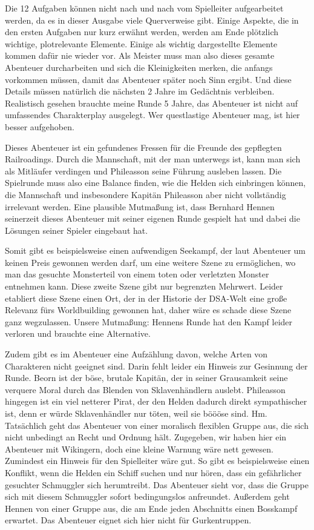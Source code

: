 \documentclass[final]{multiversum}
\begin{document}
Die 12 Aufgaben können nicht nach und nach vom Spielleiter aufgearbeitet werden, 
da es in dieser Ausgabe
viele Querverweise gibt. Einige Aspekte, die in den ersten Aufgaben nur kurz
erwähnt werden, werden am Ende plötzlich wichtige, plotrelevante Elemente. Einige
als wichtig dargestellte Elemente kommen dafür nie wieder vor. Als Meister muss
man also dieses gesamte Abenteuer durcharbeiten und sich die Kleinigkeiten
merken, die anfangs vorkommen müssen, damit das Abenteuer später noch Sinn
ergibt. Und diese Details müssen natürlich die nächsten 2 Jahre im Gedächtnis
verbleiben. Realistisch gesehen brauchte meine Runde 5 Jahre, das Abenteuer ist
nicht auf umfassendes Charakterplay ausgelegt. Wer questlastige Abenteuer mag,
ist hier besser aufgehoben.

Dieses Abenteuer ist ein gefundenes Fressen für die Freunde des gepflegten
Railroadings. Durch die Mannschaft, mit der man unterwegs ist, kann man sich als
Mitläufer verdingen und Phileasson seine Führung ausleben lassen. Die Spielrunde
muss also eine Balance finden, wie die Helden sich einbringen können, die
Mannschaft und insbesondere Kapitän Phileasson aber nicht vollständig irrelevant
werden. Eine plausible Mutmaßung ist, dass Bernhard Hennen seinerzeit dieses
Abenteuer mit seiner eigenen Runde gespielt hat und dabei die Lösungen seiner
Spieler eingebaut hat.

Somit gibt es beispielsweise einen aufwendigen Seekampf, der laut Abenteuer um
keinen Preis gewonnen werden darf, um eine weitere Szene zu ermöglichen, wo man
das gesuchte Monsterteil von einem toten oder verletzten Monster entnehmen kann.
Diese zweite Szene gibt nur begrenzten Mehrwert. Leider etabliert diese Szene
einen Ort, der in der Historie der DSA-Welt eine große Relevanz fürs
Worldbuilding gewonnen hat, daher wäre es schade diese Szene ganz wegzulassen. 
Unsere Mutmaßung: Hennens Runde hat den Kampf leider verloren und brauchte eine
Alternative.

Zudem gibt es im Abenteuer eine Aufzählung davon, welche Arten von Charakteren
nicht geeignet sind. Darin fehlt leider ein Hinweis zur Gesinnung der Runde.
Beorn ist der böse, brutale Kapitän, der in seiner Grausamkeit seine verquere
Moral durch das Blenden von Sklavenhändlern auslebt. Phileasson hingegen ist ein
viel netterer Pirat, der den Helden dadurch direkt sympathischer ist, denn er
würde Sklavenhändler nur töten, weil sie böööse sind. Hm.
Tatsächlich geht das Abenteuer von einer moralisch flexiblen Gruppe aus, die
sich nicht unbedingt an Recht und Ordnung hält. Zugegeben, wir haben hier ein
Abenteuer mit Wikingern, doch eine kleine Warnung wäre nett gewesen. Zumindest
ein Hinweis für den Spielleiter wäre gut. So gibt es beispielsweise einen
Konflikt, wenn die Helden ein Schiff suchen und nur hören, dass ein gefährlicher
gesuchter Schmuggler sich herumtreibt. Das Abenteuer sieht vor, dass die Gruppe
sich mit diesem Schmuggler sofort bedingungslos anfreundet. Außerdem geht Hennen
von einer Gruppe aus, die am Ende jeden Abschnitts einen Bosskampf erwartet. Das
Abenteuer eignet sich hier nicht für Gurkentruppen.
\end{document}
